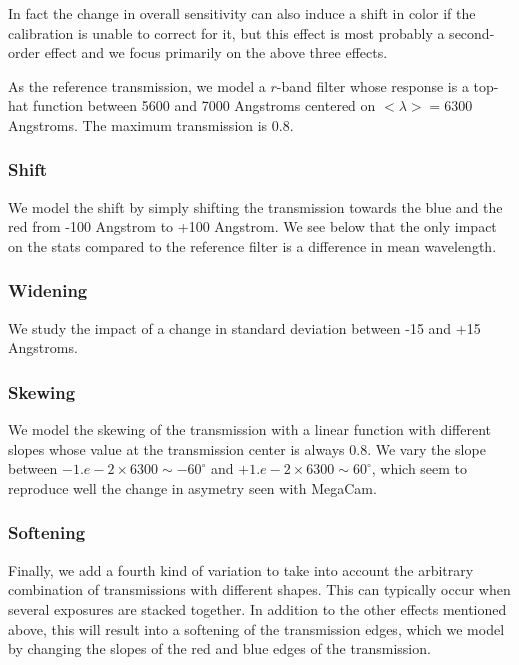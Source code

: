 \documentclass[11pt]{article}
\begin{document}
In fact the change in overall sensitivity can also induce a shift in
color if the calibration is unable to correct for it, but this effect is
most probably a second-order effect and we focus primarily on the above
three effects.

As the reference transmission, we model a \(r\)-band filter whose
response is a top-hat function between 5600 and 7000 Angstroms centered
on \(<\lambda>=6300\) Angstroms. The maximum transmission is 0.8.

\subsubsection{Shift}\label{shift}

We model the shift by simply shifting the transmission towards the blue
and the red from -100 Angstrom to +100 Angstrom. We see below that the
only impact on the stats compared to the reference filter is a
difference in mean wavelength.

\subsubsection{Widening}\label{widening}

We study the impact of a change in standard deviation between -15 and
+15 Angstroms.

\subsubsection{Skewing}\label{skewing}

We model the skewing of the transmission with a linear function with
different slopes whose value at the transmission center is always 0.8.
We vary the slope between \(-1.e-2\times6300\sim-60^{\circ}\) and
\(+1.e-2\times6300\sim60^{\circ}\), which seem to reproduce well the
change in asymetry seen with MegaCam.

\subsubsection{Softening}\label{softening}

Finally, we add a fourth kind of variation to take into account the
arbitrary combination of transmissions with different shapes. This can
typically occur when several exposures are stacked together. In addition
to the other effects mentioned above, this will result into a softening
of the transmission edges, which we model by changing the slopes of the
red and blue edges of the transmission.
\end{document}
